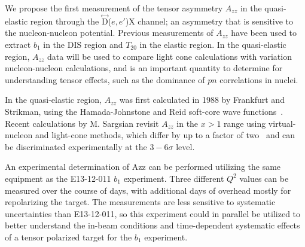 We propose the first measurement of the tensor asymmetry $A_{zz}$ in the quasi-elastic region through the $\stackrel{\leftrightarrow}{\mathrm{D}}$($e,e'$)X channel; an asymmetry that is sensitive to the nucleon-nucleon potential.  Previous measurements of $A_{zz}$ have been used to extract $b_1$ in the DIS region and $T_{20}$ in the elastic region. In the quasi-elastic region, $A_{zz}$ data will be used to compare light cone calculations with variation nucleon-nucleon calculations, and is an important quantity to determine for understanding tensor effects, such as the dominance of $pn$ correlations in nuclei.

In the quasi-elastic region, $A_{zz}$ was first calculated in 1988 by Frankfurt and Strikman, using the Hamada-Johnstone and Reid soft-core wave functions~\cite{Frankfurt:1988nt}. Recent calculations by
M. Sargsian revisit $A_{zz}$ in the $x > 1$ range using virtual-nucleon and light-cone methods, which differ by up to a factor of two~\cite{MISAK} and can be discriminated experimentally at the $3-6\sigma$ level.

An experimental determination of Azz can be performed utilizing the same equipment as the E13-12-011 $b_1$ experiment.  Three different $Q^2$ values can be measured over the course of \productiondays days, with \overheaddays additional days of overhead mostly for repolarizing the target. The measurements are less sensitive to systematic uncertainties than E13-12-011, so this experiment could in parallel be utilized to better understand the in-beam conditions and time-dependent systematic effects of a tensor polarized target for the $b_1$ experiment.





